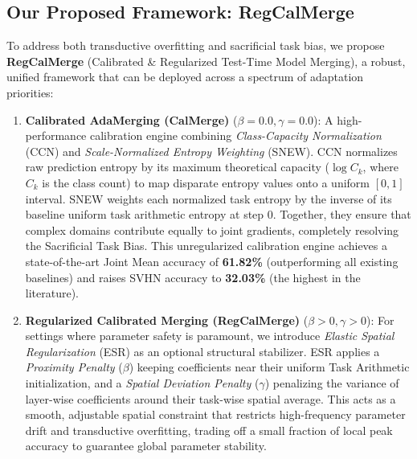 \subsection{Our Proposed Framework: RegCalMerge}
To address both transductive overfitting and sacrificial task bias, we propose \textbf{RegCalMerge} (Calibrated \& Regularized Test-Time Model Merging), a robust, unified framework that can be deployed across a spectrum of adaptation priorities:
\begin{enumerate}
    \item \textbf{Calibrated AdaMerging (CalMerge)} ($\beta=0.0, \gamma=0.0$): A high-performance calibration engine combining \emph{Class-Capacity Normalization} (CCN) and \emph{Scale-Normalized Entropy Weighting} (SNEW). CCN normalizes raw prediction entropy by its maximum theoretical capacity ($\log C_k$, where $C_k$ is the class count) to map disparate entropy values onto a uniform $[0, 1]$ interval. SNEW weights each normalized task entropy by the inverse of its baseline uniform task arithmetic entropy at step $0$. Together, they ensure that complex domains contribute equally to joint gradients, completely resolving the Sacrificial Task Bias. This unregularized calibration engine achieves a state-of-the-art Joint Mean accuracy of \textbf{61.82\%} (outperforming all existing baselines) and raises SVHN accuracy to \textbf{32.03\%} (the highest in the literature).
    \item \textbf{Regularized Calibrated Merging (RegCalMerge)} ($\beta > 0, \gamma > 0$): For settings where parameter safety is paramount, we introduce \emph{Elastic Spatial Regularization} (ESR) as an optional structural stabilizer. ESR applies a \emph{Proximity Penalty} ($\beta$) keeping coefficients near their uniform Task Arithmetic initialization, and a \emph{Spatial Deviation Penalty} ($\gamma$) penalizing the variance of layer-wise coefficients around their task-wise spatial average. This acts as a smooth, adjustable spatial constraint that restricts high-frequency parameter drift and transductive overfitting, trading off a small fraction of local peak accuracy to guarantee global parameter stability.
\end{enumerate}

